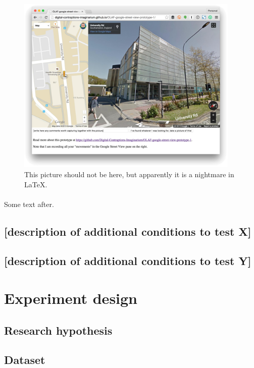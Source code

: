 \documentclass{llncs}
\begin{document}
{\begin{figure}
	\includegraphics[width=0.95\textwidth]{some_picture.png}
	\caption{This picture should not be here, but apparently it is a nightmare in LaTeX.}
	\label{fig:some_figure}
\end{figure}

\paragraph{}

Some text after.
	
\subsection{{[}description of additional conditions to test X{]}}
\subsection{{[}description of additional conditions to test Y{]}}

\section{Experiment design}

\subsection{Research hypothesis}
\subsection{Dataset}
}
\end{document}
